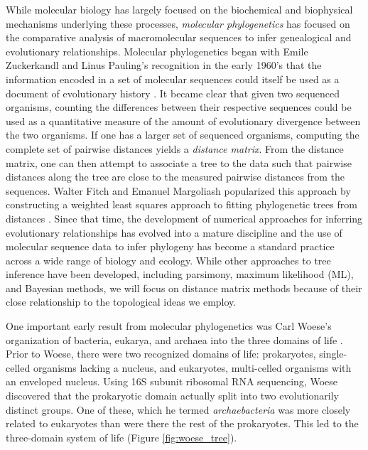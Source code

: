 While molecular biology has largely focused on the biochemical and biophysical mechanisms underlying these processes, \emph{molecular phylogenetics} has focused on the comparative analysis of macromolecular sequences to infer genealogical and evolutionary relationships.
Molecular phylogenetics began with Emile Zuckerkandl and Linus Pauling's recognition in the early 1960's that the information encoded in a set of molecular sequences could itself be used as a document of evolutionary history \cite{Zuckerkandl:1962,Zuckerkandl:1965wi}.
It became clear that given two sequenced organisms, counting the differences between their respective sequences could be used as a quantitative measure of the amount of evolutionary divergence between the two organisms.
If one has a larger set of sequenced organisms, computing the complete set of pairwise distances yields a \emph{distance matrix}.
From the distance matrix, one can then attempt to associate a tree to the data such that pairwise distances along the tree are close to the measured pairwise distances from the sequences.
Walter Fitch and Emanuel Margoliash popularized this approach by constructing a weighted least squares approach to fitting phylogenetic trees from distances \cite{Fitch:1967we}.
Since that time, the development of numerical approaches for inferring evolutionary relationships has evolved into a mature discipline and the use of molecular sequence data to infer phylogeny has become a standard practice across a wide range of biology and ecology.
While other approaches to tree inference have been developed, including parsimony, maximum likelihood (ML), and Bayesian methods, we will focus on distance matrix methods because of their close relationship to the topological ideas we employ.

One important early result from molecular phylogenetics was Carl Woese's organization of bacteria, eukarya, and archaea into the three domains of life \cite{Woese:1977vd}.
Prior to Woese, there were two recognized domains of life: prokaryotes, single-celled organisms lacking a nucleus, and eukaryotes, multi-celled organisms with an enveloped nucleus.
Using 16S subunit ribosomal RNA sequencing, Woese discovered that the prokaryotic domain actually split into two evolutionarily distinct groups.
One of these, which he termed \emph{archaebacteria} was more closely related to eukaryotes than were there the rest of the prokaryotes.
This led to the three-domain system of life (Figure \ref{fig:woese_tree}).

